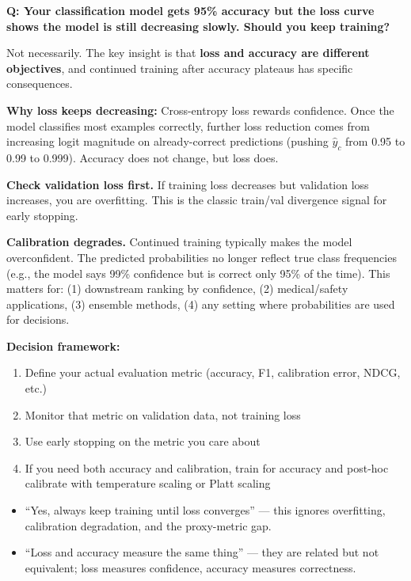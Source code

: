 \begin{interviewq}
\textbf{Q: Your classification model gets 95\% accuracy but the loss curve shows the model is still decreasing slowly. Should you keep training?}

 \quad {} \quad \badgefreq{\freqhigh}

\stronganswer Not necessarily. The key insight is that \textbf{loss and accuracy are different objectives}, and continued training after accuracy plateaus has specific consequences.

\textbf{Why loss keeps decreasing:} Cross-entropy loss rewards confidence. Once the model classifies most examples correctly, further loss reduction comes from increasing logit magnitude on already-correct predictions (pushing $\hat{y}_c$ from 0.95 to 0.99 to 0.999). Accuracy does not change, but loss does.

\textbf{Check validation loss first.} If training loss decreases but validation loss increases, you are overfitting. This is the classic train/val divergence signal for early stopping.

\textbf{Calibration degrades.} Continued training typically makes the model overconfident. The predicted probabilities no longer reflect true class frequencies (e.g., the model says 99\% confidence but is correct only 95\% of the time). This matters for: (1) downstream ranking by confidence, (2) medical/safety applications, (3) ensemble methods, (4) any setting where probabilities are used for decisions.

\textbf{Decision framework:}
\begin{enumerate}
    \item Define your actual evaluation metric (accuracy, F1, calibration error, NDCG, etc.)
    \item Monitor that metric on validation data, not training loss
    \item Use early stopping on the metric you care about
    \item If you need both accuracy and calibration, train for accuracy and post-hoc calibrate with temperature scaling or Platt scaling
\end{enumerate}

\redflags
\begin{itemize}
    \item ``Yes, always keep training until loss converges'' --- this ignores overfitting, calibration degradation, and the proxy-metric gap.
    \item ``Loss and accuracy measure the same thing'' --- they are related but not equivalent; loss measures confidence, accuracy measures correctness.
\end{itemize}


\end{interviewq}
